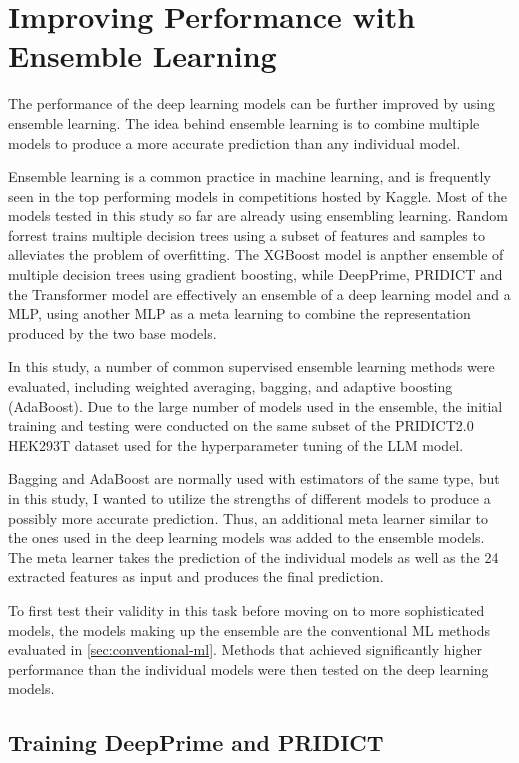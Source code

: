 \section{Improving Performance with Ensemble Learning}

The performance of the deep learning models can be further improved by using ensemble learning. The idea behind ensemble learning is to combine multiple models to produce a more accurate prediction than any individual model. 

Ensemble learning is a common practice in machine learning, and is frequently seen in the top performing models in competitions hosted by Kaggle.
Most of the models tested in this study so far are already using ensembling learning. Random forrest trains multiple decision trees using a subset of features and samples to alleviates the problem of overfitting. The XGBoost model is anpther ensemble of multiple decision trees using gradient boosting, while DeepPrime, PRIDICT and the Transformer model are effectively an ensemble of a deep learning model and a MLP, using another MLP as a meta learning to combine the representation produced by the two base models.

In this study, a number of common supervised ensemble learning methods were evaluated, including weighted averaging, bagging, and adaptive boosting (AdaBoost). Due to the large number of models used in the ensemble, the initial training and testing were conducted on the same subset of the PRIDICT2.0 HEK293T dataset used for the hyperparameter tuning of the LLM model.

Bagging and  AdaBoost are normally used with estimators of the same type, but in this study, I wanted to utilize the strengths of different models to produce a possibly more accurate prediction. Thus, an additional meta learner similar to the ones used in the deep learning models was added to the ensemble models. The meta learner takes the prediction of the individual models as well as the 24 extracted features as input and produces the final prediction.

To first test their validity in this task before moving on to more sophisticated models, the models making up the ensemble are the conventional ML methods evaluated in \autoref{sec:conventional-ml}. Methods that achieved significantly higher performance than the individual models were then tested on the deep learning models.


\subsection{Training DeepPrime and PRIDICT}
\label{sec:training-deepprime-pridict}

